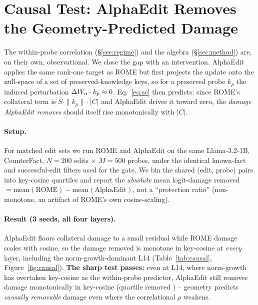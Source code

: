 \section{Causal Test: AlphaEdit Removes the Geometry-Predicted Damage}
\label{sec:causal}

The within-probe correlation (\S\ref{sec:regime}) and the \SxC{} algebra
(\S\ref{sec:method}) are, on their own, observational. We close the gap with an
intervention. AlphaEdit \citep{fang2025alphaedit} applies the same rank-one
target as ROME but first projects the update onto the null-space of a set of
preserved-knowledge keys, so for a preserved probe $k_p$ the induced
perturbation $\Delta W_\alpha\cdot k_p\approx 0$. Eq.~\ref{eq:sc} then predicts:
since ROME's collateral term is $S\cdot\|k_p\|\cdot|C|$ and AlphaEdit drives it
toward zero, the \emph{damage AlphaEdit removes} should itself rise
monotonically with $|C|$.

\paragraph{Setup.} For matched edit sets we run ROME and AlphaEdit on the same
Llama-3.2-1B, CounterFact, $N{=}200$ edits $\times$ $M{=}500$ probes, under the
identical known-fact and successful-edit filters used for the gate. We
bin the shared (edit, probe) pairs into key-cosine quartiles and report the
\emph{absolute} mean logit-damage removed $=\text{mean}(\text{ROME})-
\text{mean}(\text{AlphaEdit})$, not a ``protection ratio'' (non-monotone, an
artifact of ROME's own cosine-scaling).

\paragraph{Result (3 seeds, all four layers).} AlphaEdit floors collateral
damage to a small residual while ROME damage scales with cosine, so the damage
removed is monotone in key-cosine at \emph{every} layer, including the
norm-growth-dominant L14 (Table~\ref{tab:causal}, Figure~\ref{fig:causal}).
\textbf{The sharp test passes:} even at L14, where norm-growth has overtaken
key-cosine as the within-probe predictor, AlphaEdit still removes damage
monotonically in key-cosine (quartile removed \cbcQuartLfourteen{}) --
geometry predicts \emph{causally removable} damage even where the correlational
$\rho$ weakens.


